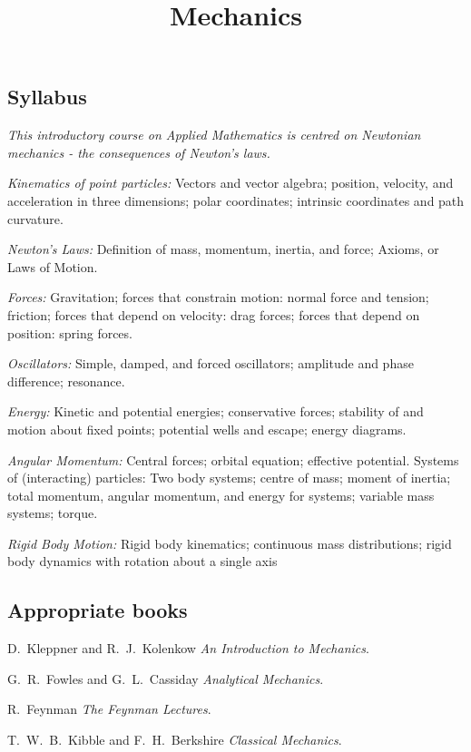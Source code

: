 \documentclass[10pt]{scrartcl}
\title{Mechanics}
\begin{document}
{
\subsection*{Syllabus} 

\textit{This introductory course on Applied Mathematics is centred on Newtonian mechanics - the consequences of Newton’s laws.}

\emph{Kinematics of point particles:} Vectors and vector algebra; position, velocity, and acceleration in three dimensions; polar coordinates; intrinsic coordinates and path curvature.

\emph{Newton's Laws:} Definition of mass, momentum, inertia, and force; Axioms, or Laws of Motion. 

\emph{Forces:} Gravitation; forces that constrain motion: normal force and tension; friction; forces that depend on velocity: drag forces; forces that depend on position: spring forces. 

\emph{Oscillators:} Simple, damped, and forced oscillators; amplitude and phase difference; resonance.

\emph{Energy:} Kinetic and potential energies; conservative forces; stability of and motion about fixed points; potential wells and escape; energy diagrams.

\emph{Angular Momentum:} Central forces; orbital equation; effective potential. Systems of (interacting) particles: Two body systems; centre of mass; moment of inertia; total momentum, angular momentum, and energy for systems; variable mass systems; torque. 

\emph{Rigid Body Motion:} Rigid body kinematics; continuous mass distributions; rigid body dynamics with rotation about a single axis

\subsection*{Appropriate books}

{\shortskip
D.~Kleppner and R.~J.~Kolenkow \emph{An Introduction to Mechanics}.

G.~R.~Fowles and G.~L.~Cassiday \emph{Analytical Mechanics}.

R.~Feynman \emph{The Feynman Lectures}.

T.~W.~B.~Kibble and F.~H.~Berkshire \emph{Classical Mechanics}.

}
}
\end{document}
